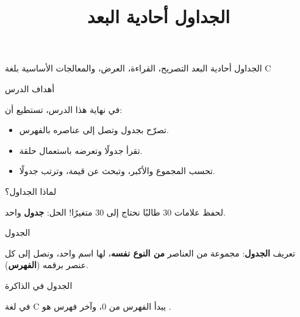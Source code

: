 \documentclass[aspectratio=169, 11pt, t, xcolor={table}]{beamer}
\title{الجداول أحادية البعد}
\begin{document}
{الجداول أحادية البعد}
{التصريح، القراءة، العرض، والمعالجات الأساسية بلغة \textenglish{C}}

\begin{frame}{أهداف الدرس}
    \begin{tbox}{\faBullseye\quad في نهاية هذا الدرس، تستطيع أن:}
        \begin{itemize}
            \item تصرّح بجدول وتصل إلى عناصره بالفهرس.
            \item تقرأ جدولًا وتعرضه باستعمال حلقة.
            \item تحسب المجموع والأكبر، وتبحث عن قيمة، وترتب جدولًا.
        \end{itemize}
    \end{tbox}
\end{frame}

\begin{frame}{لماذا الجداول؟}
    \begin{center}
    \begin{minipage}{0.62\textwidth}
    \end{minipage}
    \end{center}
    \vspace{0.3cm}
    لحفظ علامات 30 طالبًا نحتاج إلى 30 متغيرًا! الحل: \textbf{جدول} واحد.
\end{frame}

\begin{frame}{الجدول}
    \begin{tbox}{\faLightbulb\quad تعريف}
        \textbf{الجدول}: مجموعة من العناصر \textbf{من النوع نفسه}،
        لها اسم واحد، ونصل إلى كل عنصر برقمه (\textbf{الفهرس}).
    \end{tbox}
\end{frame}

\begin{frame}{الجدول في الذاكرة}
    \vspace{0.5cm}
    \begin{center}
    \end{center}
    \vspace{0.3cm}
    في لغة \textenglish{C} يبدأ الفهرس من \textenglish{0}، وآخر فهرس هو .
\end{frame}
\end{document}
